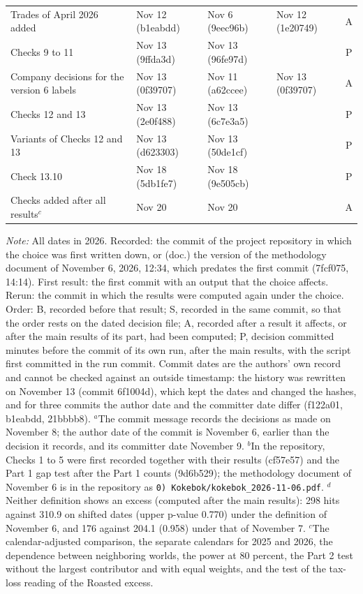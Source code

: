 \begin{table}[htbp]
\begin{tabularx}{\linewidth}{@{}>{\raggedright\arraybackslash}Xlllc@{}}
Trades of April 2026 added & Nov 12 (b1eabdd) & Nov 6 (9eec96b) & Nov 12 (1e20749) & A \\
Checks 9 to 11 & Nov 13 (9ffda3d) & Nov 13 (96fe97d) &  & P \\
Company decisions for the version 6 labels & Nov 13 (0f39707) & Nov 11 (a62ccee) & Nov 13 (0f39707) & A \\
Checks 12 and 13 & Nov 13 (2e0f488) & Nov 13 (6c7e3a5) &  & P \\
Variants of Checks 12 and 13 & Nov 13 (d623303) & Nov 13 (50de1cf) &  & P \\
Check 13.10 & Nov 18 (5db1fe7) & Nov 18 (9e505cb) &  & P \\
\midrule
Checks added after all results$^{c}$ & Nov 20 & Nov 20 &  & A \\
\bottomrule
\end{tabularx}
\par\medskip
\begin{minipage}{\linewidth}\scriptsize\textit{Note:} All dates in 2026. Recorded: the commit of the project repository in which the choice was first written down, or (doc.) the version of the methodology document of November 6, 2026, 12:34, which predates the first commit (7fcf075, 14:14). First result: the first commit with an output that the choice affects. Rerun: the commit in which the results were computed again under the choice. Order: B, recorded before that result; S, recorded in the same commit, so that the order rests on the dated decision file; A, recorded after a result it affects, or after the main results of its part, had been computed; P, decision committed minutes before the commit of its own run, after the main results, with the script first committed in the run commit. Commit dates are the authors' own record and cannot be checked against an outside timestamp: the history was rewritten on November 13 (commit 6f1004d), which kept the dates and changed the hashes, and for three commits the author date and the committer date differ (f122a01, b1eabdd, 21bbbb8). $^{a}$The commit message records the decisions as made on November 8; the author date of the commit is November 6, earlier than the decision it records, and its committer date November 9. $^{b}$In the repository, Checks 1 to 5 were first recorded together with their results (cf57e57) and the Part 1 gap test after the Part 1 counts (9d6b529); the methodology document of November 6 is in the repository as \texttt{0) Kokebok/kokebok\_2026-11-06.pdf}. $^{d}$Neither definition shows an excess (computed after the main results): 298 hits against 310.9 on shifted dates (upper p-value 0.770) under the definition of November 6, and 176 against 204.1 (0.958) under that of November 7. $^{c}$The calendar-adjusted comparison, the separate calendars for 2025 and 2026, the dependence between neighboring worlds, the power at 80 percent, the Part 2 test without the largest contributor and with equal weights, and the test of the tax-loss reading of the Roasted excess.\end{minipage}
\end{table}

